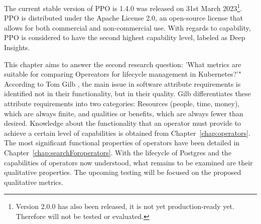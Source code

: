 The current stable version of PPO is 1.4.0 was released on 31st March 2023\footnote[4]{Version 2.0.0 has also been released, it is not yet production-ready yet. Therefore will not be tested or evaluated.}. \cite{PerconaDocuV2} PPO is distributed under the Apache License 2.0, an open-source license that allows for both commercial and non-commercial use. With regards to capability, PPO is considered to have the second highest capability level, labeled as Deep Insights. \cite{operatorHubPercona}



\label{chap:metrics}
This chapter aims to answer the second research question: 'What metrics are suitable for comparing Opereators for lifecycle management in
Kubernetes?'" According to Tom Gilb \cite{gilb1988principles}, the main issue in software attribute requirements is identified not in their functionality, but in their quality. Gilb differentiates these attribute requirements into two categories: Resources (people, time, money), which are always finite, and qualities or benefits, which are always fewer than desired. Knowledge about the functionality that an operator must provide to achieve a certain level of capabilities is obtained from Chapter~\ref{chap:operators}. The most significant functional properties of operators have been detailed in Chapter~\ref{chap:searchForoperators}. With the lifecycle of Postgres and the capabilities of operators now understood, what remains to be examined are their qualitative properties. The upcoming testing will be focused on the proposed qualitative metrics.


